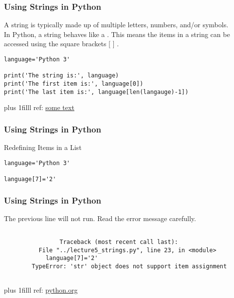 \documentclass[fleqn]{beamer} %
\newcommand{\sectiontitleII}{Using Strings in Python }
\newcommand{\btVFill}{\vskip0pt plus 1filll}
\begin{document}
	\begin{frame}[containsverbatim] \small
		\frametitle{\sectiontitleII}

A string is typically made up of multiple letters, numbers, and/or symbols. \\ \vspace{2mm} 
In Python, a string behaves like a \underline{\hspace{15mm}}. This means the items in a string can be accessed using the square brackets [ ] . \\ \vspace{2mm}   		

		\begin{lstlisting}
language='Python 3'

print('The string is:', language) 
print('The first item is:', language[0])
print('The last item is:', language[len(langauge)-1])
		\end{lstlisting}

		\btVFill
		\tiny{ref: \href{some link}{some text}}
	\end{frame}	

	\begin{frame}[containsverbatim] \small
		\frametitle{\sectiontitleII}
		
		Redefining Items in a List	

		\begin{lstlisting}
language='Python 3'

language[7]='2'		
		\end{lstlisting}

	\end{frame}

	\begin{frame}[containsverbatim] \small
		\frametitle{\sectiontitleII}

		The previous line will not run. Read the error message carefully.

		\begin{framed}
			\begin{verbatim}
				
				Traceback (most recent call last):
		  File "../lecture5_strings.py", line 23, in <module>
		    language[7]='2'
		TypeError: 'str' object does not support item assignment
				
			\end{verbatim}
		\end{framed}

		\btVFill
		\tiny{ref: \href{}{python.org}}
	\end{frame}	
\end{document}
